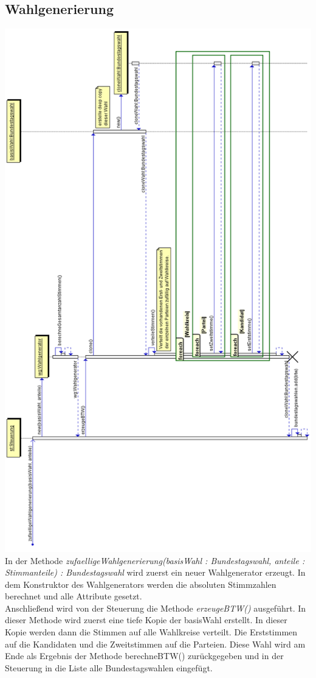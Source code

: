 \documentclass[12pt,a4paper,titlepage]{article}
\newcommand{\mymo}{\fontfamily{pcr}\selectfont \textit}
\begin{document}
\subsection{Wahlgenerierung}
\includegraphics[scale=0.65]{Sequenzdiagramme/Wahlgenerierung.png}
In der Methode {\mymo{zufaelligeWahlgenerierung(basisWahl : Bundestagswahl, anteile : Stimmanteile) : Bundestagswahl}} wird zuerst ein neuer Wahlgenerator erzeugt. In dem Konstruktor des Wahlgenerators werden die absoluten Stimmzahlen berechnet und alle Attribute gesetzt.\\
Anschließend wird von der Steuerung die Methode {\mymo{erzeugeBTW()}} ausgeführt. In dieser Methode wird zuerst eine tiefe Kopie der basisWahl erstellt. In dieser Kopie werden dann die Stimmen auf alle Wahlkreise verteilt. Die Erststimmen auf die Kandidaten und die Zweitstimmen auf die Parteien. Diese Wahl wird am Ende als Ergebnis der Methode berechneBTW() zurückgegeben und in der Steuerung in die Liste alle Bundestagswahlen eingefügt.
\end{document}
